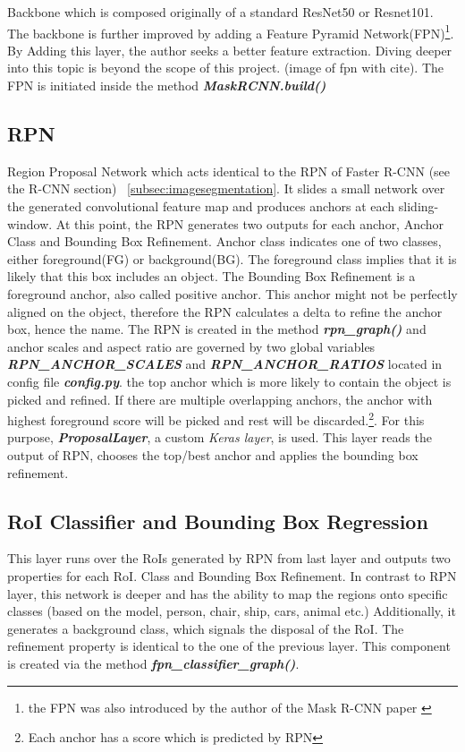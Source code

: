 Backbone which is composed originally of a standard ResNet50 or Resnet101. The backbone is further improved by adding a Feature Pyramid Network(FPN)\footnote{the FPN was also introduced by the author of the Mask R-CNN paper \cite{ LinDGHHB16}}. By Adding this layer, the author seeks a better feature extraction. Diving deeper into this topic is beyond the scope of this project. (image of fpn with cite). The FPN is initiated inside the method \textbf{\textit{MaskRCNN.build()}}

\subsection{RPN}
\label{subsec:rpn}

Region Proposal Network which acts identical to the RPN of Faster R-CNN (see the R-CNN section) ~\ref{subsec:imagesegmentation}. It slides a small network over the generated convolutional feature map and produces anchors at each sliding-window. At this point, the RPN generates two outputs for each anchor, Anchor Class and Bounding Box Refinement. Anchor class indicates one of two classes, either foreground(FG) or background(BG). The foreground class implies that it is likely that this box includes an object.  The Bounding Box Refinement is a foreground anchor, also called positive anchor. This anchor might not be perfectly aligned on the object, therefore the RPN calculates a delta to refine the anchor box, hence the name. The RPN is created in the method \textbf{\textit{rpn\_graph()}} and anchor scales and aspect ratio are governed by two global variables \textbf{\textit{RPN\_ANCHOR\_SCALES}} and \textbf{\textit{RPN\_ANCHOR\_RATIOS}}  located in config file \textbf{\textit{config.py}}. the top anchor which is more likely to contain the object is picked and refined. If there are multiple overlapping anchors, the anchor with highest foreground score will be picked and rest will be discarded.\footnote{Each anchor has a score which is predicted by RPN}. For this purpose, \textbf{\textit{ProposalLayer}}, a custom \textit{Keras layer}, is used. This layer reads the output of RPN, chooses the top/best anchor and applies the bounding box refinement. 

\subsection{RoI Classifier and Bounding Box Regression}
\label{subsec:roi-classifier}

This layer runs over the RoIs generated by RPN from last layer and outputs two properties for each RoI. Class and Bounding Box Refinement. In contrast to RPN layer, this network is deeper and has the ability to map the regions onto specific classes (based on the model, person, chair, ship, cars, animal etc.) Additionally, it generates a background class, which signals the disposal of the RoI. The refinement property is identical to the one of the previous layer. This component is created via the method \textbf{\textit{fpn\_classifier\_graph()}}.

